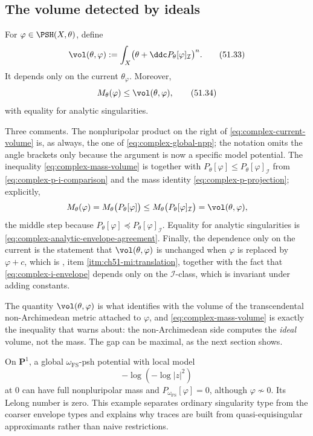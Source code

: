 \subsection{The volume detected by ideals}
\label{sec:ch51-current-volume}

\begin{definition}
\label{def:complex-current-volume}
For \(\varphi\in\PSH(X,\theta)\), define
\[
 \vol(\theta,\varphi)
 :=\int_X\bigl(\theta+\ddc
             P_\theta[\varphi]_{\mathcal I}\bigr)^n.
\tag{51.33}\label{eq:complex-current-volume}
\]
It depends only on the current \(\theta_\varphi\).  Moreover,
\[
 M_\theta(\varphi)\leq\vol(\theta,\varphi),
\tag{51.34}\label{eq:complex-mass-volume}
\]
with equality for analytic singularities.
\end{definition}

Three comments.  The nonpluripolar product on the right of
\eqref{eq:complex-current-volume} is, as always, the one of
\eqref{eq:complex-global-npp}; the notation omits the angle brackets only
because the argument is now a specific model potential.  The inequality
\eqref{eq:complex-mass-volume} is
 together with
\(P_\theta[\varphi]\leq P_\theta[\varphi]_{\mathcal I}\) from
\eqref{eq:complex-p-i-comparison} and the mass identity
\eqref{eq:complex-p-projection}; explicitly,
\[
 M_\theta(\varphi)
 =M_\theta\bigl(P_\theta[\varphi]\bigr)
 \leq M_\theta\bigl(P_\theta[\varphi]_{\mathcal I}\bigr)
 =\vol(\theta,\varphi),
\]
the middle step because \(P_\theta[\varphi]\preceq
P_\theta[\varphi]_{\mathcal I}\).  Equality for analytic singularities is
\eqref{eq:complex-analytic-envelope-agreement}.  Finally, the dependence
only on the current is the statement that
\(\vol(\theta,\varphi)\) is unchanged when \(\varphi\) is replaced by
\(\varphi+c\), which is
, item
\cref{itm:ch51-mi:translation}, together with the fact that
\eqref{eq:complex-i-envelope} depends only on the
\(\mathcal I\)-class, which is invariant under adding constants.

The quantity \(\vol(\theta,\varphi)\) is what
 identifies with the volume of the
transcendental non-Archimedean metric attached to \(\varphi\), and
\eqref{eq:complex-mass-volume} is exactly the inequality that
 warns about: the non-Archimedean side
computes the \emph{ideal} volume, not the mass.  The gap can be
maximal, as the next section shows.

\begin{example}
\label{ex:complex-loglog-envelope}
On \(\mathbf P^1\), a global \(\omega_{\mathrm{FS}}\)-psh potential with
local model
\[
                        -\log(-\log|z|^2)
\]
at \(0\) can have full nonpluripolar mass and
\(P_{\omega_{\mathrm{FS}}}[\varphi]=0\), although
\(\varphi\not\sim0\).  Its Lelong number is zero.  This example separates
ordinary singularity type from the coarser envelope types and explains
why traces are built from quasi-equisingular approximants rather than
naive restrictions.
\end{example}


